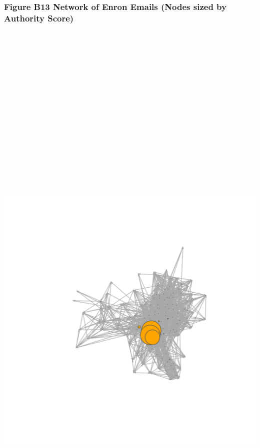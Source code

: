 \documentclass[]{article}
\begin{document}
\newpage

\subsubsection{Figure B13 Network of Enron Emails (Nodes sized by
Authority
Score)}\label{figure-b13-network-of-enron-emails-nodes-sized-by-authority-score}

\section{\texorpdfstring{\protect\includegraphics[height=12.50000in]{images/n_as.png}}{Network of Enron Emails}}\label{network-of-enron-emails-10}
\end{document}
